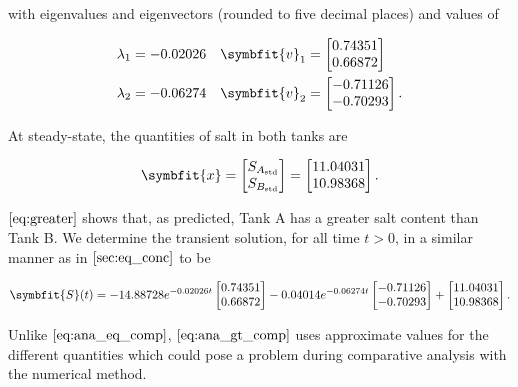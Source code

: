 with eigenvalues and eigenvectors (rounded to five decimal places) and
values of

\begin{align*}
  \lambda_1 &= -0.02026 & \symbfit{v}_1 &= \begin{bmatrix} 0.74351 \\ 0.66872 \end{bmatrix} \\
  \lambda_2 &= -0.06274 & \symbfit{v}_2 &= \begin{bmatrix} -0.71126 \\ -0.70293 \end{bmatrix}.
\end{align*}

At steady-state, the quantities of salt in both tanks are

\begin{equation} \label{eq:greater}
  \symbfit{x} = \begin{bmatrix}
                  S_{A_{\text{std}}} \\
                  S_{B_{\text{std}}}
                \end{bmatrix} = \begin{bmatrix}
              11.04031 \\
              10.98368
            \end{bmatrix}.
\end{equation}

\(\autoref{eq:greater}\) shows that, as predicted, Tank A has a greater
salt content than Tank B. We determine the transient solution, for all
time \(t > 0\), in a similar manner as in \(\ref{sec:eq_conc}\) to be

\begin{equation} \label{eq:ana_gt_comp}
\symbfit{S}(t) = -14.88728e^{-0.02026t}\begin{bmatrix} 0.74351 \\ 0.66872 \end{bmatrix}
  - 0.04014e^{-0.06274t}\begin{bmatrix} -0.71126 \\ -0.70293 \end{bmatrix}
  +  \begin{bmatrix} 11.04031 \\ 10.98368 \end{bmatrix}.
\end{equation}

Unlike \(\autoref{eq:ana_eq_comp}\), \(\autoref{eq:ana_gt_comp}\) uses
approximate values for the different quantities which could pose a
problem during comparative analysis with the numerical method.


